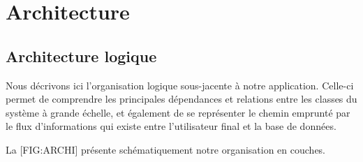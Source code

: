 \chapter[CH:ARCHI]{Architecture}

\section{Architecture logique}

Nous décrivons ici l'organisation logique sous-jacente à notre application.
Celle-ci permet de comprendre les principales dépendances et relations entre les classes du système à grande échelle, et également de se représenter le chemin emprunté par le flux d'informations qui existe entre l'utilisateur final et la base de données.
\blank

La [FIG:ARCHI] présente schématiquement notre organisation en couches.

